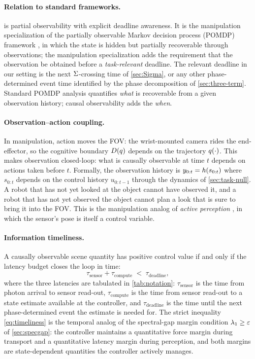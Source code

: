 \paragraph{Relation to standard frameworks.}
 is partial observability with explicit
deadline awareness. It is the manipulation specialization of the
partially observable Markov decision process (POMDP) framework
\citep{KaelblingLittmanCassandra1998}, in which the state is
hidden but partially recoverable through observations; the
manipulation specialization adds the requirement that the
observation be obtained before a \emph{task-relevant} deadline.
The relevant deadline in our setting is the next
$\Sigma$-crossing time of \cref{sec:Sigma}, or any other
phase-determined event time identified by the phase decomposition
of \cref{sec:three-term}. Standard POMDP analysis quantifies
\emph{what} is recoverable from a given observation history;
causal observability adds the \emph{when}.

\paragraph{Observation--action coupling.}
In manipulation, action moves the FOV: the wrist-mounted camera
rides the end-effector, so the cognitive boundary
$D(q)$ depends on the trajectory $q(\cdot)$.
This makes observation closed-loop: what is causally observable
at time $t$ depends on actions taken before $t$. Formally, the
observation history is
$y_{0:t} = h(s_{0:t})$
where $s_{0:t}$ depends on the control history $u_{0:t-1}$
through the dynamics of \cref{sec:task-null}. A robot that has
not yet looked at the object cannot have observed it, and a
robot that has not yet observed the object cannot plan a look
that is sure to bring it into the FOV. This is the manipulation
analog of \emph{active perception} \citep{Bajcsy1988}, in which
the sensor's pose is itself a control variable.

\paragraph{Information timeliness.}
A causally observable scene quantity has positive control value
if and only if the latency budget closes the loop in time:
\begin{equation}
\label{eq:timeliness}
  \tau_{\mathrm{sensor}} + \tau_{\mathrm{compute}}
  \;<\; \tau_{\mathrm{deadline}},
\end{equation}
where the three latencies are tabulated in \cref{tab:notation}:
$\tau_{\mathrm{sensor}}$ is the time from photon arrival to
sensor read-out, $\tau_{\mathrm{compute}}$ is the time from
sensor read-out to a state estimate available at the controller,
and $\tau_{\mathrm{deadline}}$ is the time until the next
phase-determined event the estimate is needed for. The strict
inequality \eqref{eq:timeliness} is the temporal analog of the
spectral-gap margin condition $\lambda_{1} \ge \varepsilon$ of
\cref{sec:specgap}: the controller maintains a quantitative
force margin during transport and a quantitative latency margin
during perception, and both margins are state-dependent
quantities the controller actively manages.

